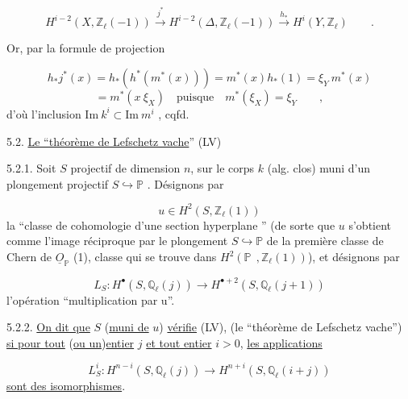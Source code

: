 \begin{equation*}
H^{i-2}(X,\mathbb{Z}_{\ell}(-1)) \stackrel{j^*}{\longrightarrow} H^{i-2}(\Delta,\mathbb{Z}_{\ell}(-1)) \stackrel{h_*}{\longrightarrow} H^i(Y,\mathbb{Z}_{\ell}) \qquad .
\end{equation*}


Or, par la formule de projection

\begin{equation*}
h_*j^*(x) = h_*(h^*(m^*(x))) = m^*(x)h_*(1) = \xi_Y\ m^*(x)
\end{equation*}
\begin{equation*}
= m^*(x\ \xi_X) \quad \mbox{puisque} \quad m^*(\xi_X) = \xi_Y \qquad ,
\end{equation*}
d'où l'inclusion $\mathrm{Im}\ k^i \subset \mathrm{Im}\ m^i$ , cqfd.


5.2.  \underline{Le ``théorème de Lefschetz vache}'' (LV)

5.2.1.  Soit $S$ projectif de dimension $n$, sur le corps $k$ (alg. clos) muni d'un plongement projectif $S \hookrightarrow \mathbb{P}$ . Désignons par

\begin{equation*}
u \in H^2(S,\mathbb{Z}_{\ell}(1))
\end{equation*}
la ``classe de cohomologie d'une section hyperplane '' (de sorte que $u$ s'obtient comme l'image réciproque par le plongement $S \hookrightarrow \mathbb{P}$ de la première classe de Chern de $\underline{O}_{\mathbb{P}}$ (1), classe qui se trouve dans $H^2(\mathbb{P}\ \ , \mathbb{Z}_{\ell}(1))$), et désignons par

\begin{equation*}
L_S : H^{\bullet}(S,\mathbb{Q}_{\ell}(j)) \longrightarrow H^{\bullet+2}(S,\mathbb{Q}_{\ell}(j+1))
\end{equation*}
l'opération ``multiplication par u''.

5.2.2. \underline{On dit  que} $S$ (\underline{muni de} $u$) \underline{vérifie} (LV), (le ``théorème de Lefschetz vache'') \underline{si pour tout} (\underline{ou un})\underline{entier} $j$ \underline{et tout entier} $i > 0$, \underline{les applications}

\begin{equation*}
L_S^i : H^{n-i}(S,\mathbb{Q}_{\ell}(j)) \longrightarrow H^{n+i}(S,\mathbb{Q}_{\ell}(i+j))
\end{equation*}
\underline{sont des isomorphismes}.


